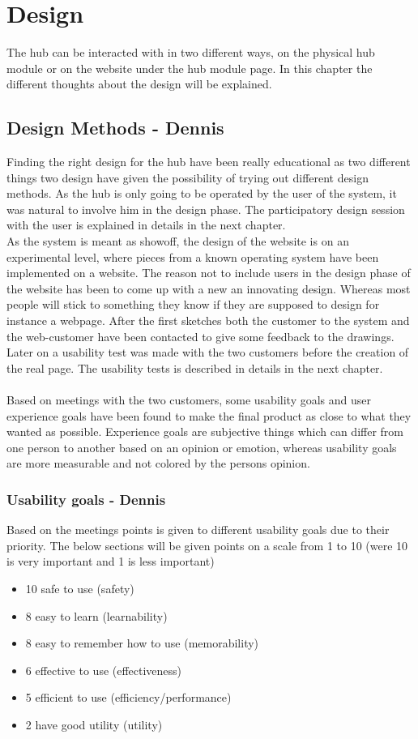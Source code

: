 \chapter{Design}
The  hub can be interacted with in two different ways, on the physical hub module or on the website under the hub module page. In this chapter the different thoughts about the design will be explained.
\section{Design Methods - Dennis}
Finding the right design for the hub have been really educational as two different things two design have given the possibility of trying out different design methods. As the hub is only going to be operated by the user of the system, it was natural to involve him in the design phase. The participatory design session with the user is explained in details in the next chapter.
\\As the system is meant as showoff, the design of the website is on an experimental level, where pieces from a known operating system have been implemented on a website. The reason not to include users in the design phase of the website has been to come up with a new an innovating design. Whereas most people will stick to something they know if they are supposed to design for instance a webpage. After the first sketches both the customer to the system and the web-customer have been contacted to give some feedback to the drawings. Later on a usability test was made with the two customers before the creation of the real page. The usability tests is described in details in the next chapter.
\\ \\
Based on meetings with the two customers, some usability goals and user experience goals have been found to make the final product as close to what they wanted as possible. Experience goals are subjective things which can differ from one person to another based on an opinion or emotion, whereas usability goals are more measurable and not colored by the persons opinion.
\subsection{Usability goals - Dennis}
Based on the meetings points is given to different usability goals due to their priority. 
The below sections will be given points on a scale from 1 to 10 (were 10 is very important and 1 is less important)
\begin{itemize}
	\item 10 safe to use (safety)
	\item 8 easy to learn (learnability) 
	\item 8 easy to remember how to use (memorability)
	\item 6 effective to use (effectiveness) 
	\item 5 efficient to use (efficiency/performance)
	\item 2 have good utility (utility)	
\end{itemize}
